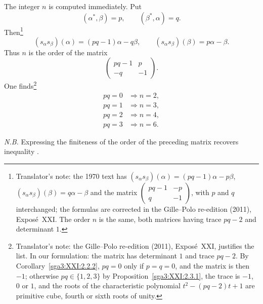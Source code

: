\begin{remark}\label{sga3:XXI:3.4.5}
The integer \(n\) is computed immediately. Put
\[
 (\alpha^\ast,\beta)=p,\qquad
 (\beta^\ast,\alpha)=q.
\]
Then\footnote{Translator's note: the 1970 text has
\((s_\alpha s_\beta)(\alpha)=(pq-1)\alpha-p\beta\), \((s_\alpha s_\beta)(\beta)=q\alpha-\beta\)
and the matrix \(\left(\begin{smallmatrix}pq-1&-p\\ q&-1\end{smallmatrix}\right)\), with
\(p\) and \(q\) interchanged; the formulas are corrected in the Gille--Polo re-edition
(2011), Exposé~XXI. The order \(n\) is the same, both matrices having trace \(pq-2\) and
determinant \(1\).}
\[
 (s_\alpha s_\beta)(\alpha)=(pq-1)\alpha-q\beta,
 \qquad
 (s_\alpha s_\beta)(\beta)=p\alpha-\beta.
\]
Thus \(n\) is the order of the matrix
\[
 \begin{pmatrix}
  pq-1 & p\\
  -q   & -1
 \end{pmatrix}.
\]
One finds\footnote{Translator's note: the Gille--Polo re-edition (2011), Exposé~XXI, justifies the list. In our formulation: the
matrix has determinant \(1\) and trace \(pq-2\). By Corollary~\ref{sga3:XXI:2.2.2},
\(pq=0\) only if \(p=q=0\), and the matrix is then \(-1\); otherwise \(pq\in\{1,2,3\}\)
by Proposition~\ref{sga3:XXI:2.3.1}, the trace is \(-1\), \(0\) or \(1\), and the roots of
the characteristic polynomial \(t^2-(pq-2)t+1\) are primitive cube, fourth or sixth
roots of unity.}
\[
\begin{aligned}
 pq=0&\Longrightarrow n=2,\\
 pq=1&\Longrightarrow n=3,\\
 pq=2&\Longrightarrow n=4,\\
 pq=3&\Longrightarrow n=6.
\end{aligned}
\]

\smallskip
\noindent
\emph{N.B.} Expressing the finiteness of the order of the preceding
matrix recovers inequality .
\end{remark}
